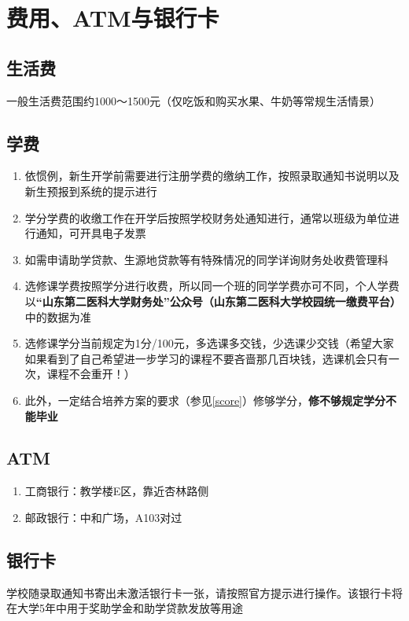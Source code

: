 \chapter[费用、ATM与银行卡]{费用、ATM与银行卡}

\section[生活费]{生活费}
一般生活费范围约1000～1500元（仅吃饭和购买水果、牛奶等常规生活情景）

\section[学费]{学费\footnotemark}
\begin{enumerate}
    \item 依惯例，新生开学前需要进行注册学费的缴纳工作，按照录取通知书说明以及新生预报到系统\footnotemark 的提示进行
    \item 学分学费的收缴工作在开学后按照学校财务处通知进行，通常以班级为单位进行通知，可开具电子发票
    \item 如需申请助学贷款、生源地贷款等有特殊情况的同学详询财务处收费管理科
    \item 选修课学费按照学分进行收费，所以同一个班的同学学费亦可不同，个人学费以\textbf{“山东第二医科大学财务处”公众号（山东第二医科大学校园统一缴费平台）}中的数据为准
    \item 选修课学分当前规定为1分/100元，多选课多交钱，少选课少交钱（希望大家如果看到了自己希望进一步学习的课程不要吝啬那几百块钱，选课机会只有一次，课程不会重开！）
    \item 此外，一定结合培养方案的要求（参见\uline{\ref{score}}）修够学分，\textbf{修不够规定学分不能毕业}
\end{enumerate}

\section[ATM]{ATM\footnotemark}
\begin{enumerate}
    \item 工商银行：教学楼E区，靠近杏林路侧
    \item 邮政银行：中和广场，A103对过
\end{enumerate}

\section[银行卡]{银行卡}
学校随录取通知书寄出未激活银行卡一张，请按照官方提示进行操作。该银行卡将在大学5年中用于奖助学金和助学贷款发放等用途
